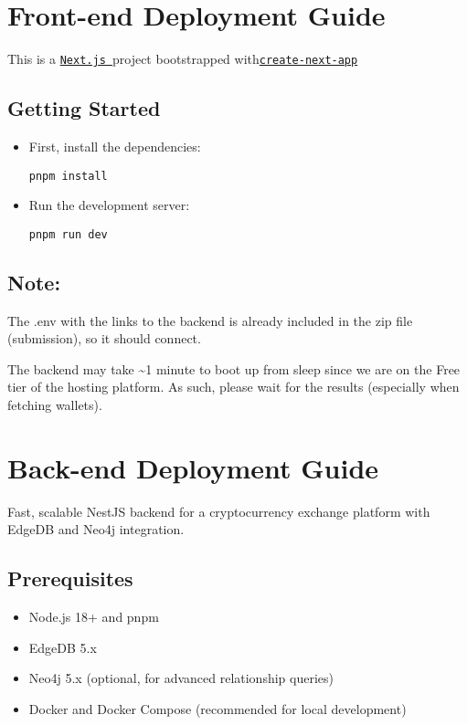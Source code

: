\section{Front-end Deployment Guide}
This is a \href{https://nextjs.org/}{\colorbox{yellow!30}{\texttt{Next.js }}}project bootstrapped with\href{https://nextjs.org/docs/app/api-reference/cli/create-next-app}{\colorbox{yellow!30}{\texttt{create-next-app}}} 
\subsection*{Getting Started}
\begin{itemize}

  \item First, install the dependencies:
  \begin{tcolorbox}[width=\textwidth, boxrule=0.5pt, colback=gray!5, colframe=gray!50]
\begin{verbatim}
pnpm install
\end{verbatim}
\end{tcolorbox}
  \item Run the development server:
  \begin{tcolorbox}[width=\textwidth, boxrule=0.5pt, colback=gray!5, colframe=gray!50]
\begin{verbatim}
pnpm run dev
\end{verbatim}
\end{tcolorbox}
   \end{itemize}
\subsection*{Note:}

The .env with the links to the backend is already included in the zip file (submission),  so it should connect.

The backend may take \textasciitilde{}1 minute to boot up from sleep since we are on the Free tier of the hosting platform. As such, please wait for the results (especially when fetching wallets).
\newpage
\section{Back-end Deployment Guide}
Fast, scalable NestJS backend for a cryptocurrency exchange platform with EdgeDB and Neo4j integration.
\subsection*{Prerequisites}
\begin{itemize}
    \item Node.js 18+ and pnpm
    \item EdgeDB 5.x
    \item Neo4j 5.x (optional, for advanced relationship queries)
    \item Docker and Docker Compose (recommended for local development)
\end{itemize}
